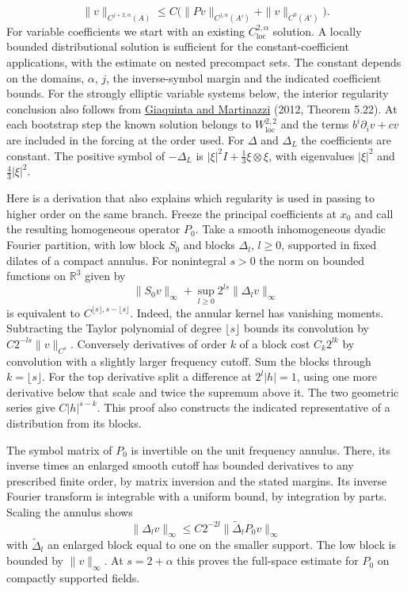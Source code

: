 \documentclass[
  english,
  11pt,
  reqno]{amsart}
\begin{document}
\label{eq:online-chart-interior-schauder-input} \[
\|v\|_{C^{j+2,\alpha}(A)}
\le C\bigl(\|Pv\|_{C^{j,\alpha}(A')}
+\|v\|_{C^0(A')}\bigr).
\] For variable coefficients we start with an existing
\(C^{2,\alpha}_{\mathrm{loc}}\) solution. A locally bounded
distributional solution is sufficient for the constant-coefficient
applications, with the estimate on nested precompact sets. The constant
depends on the domains, \(\alpha\), \(j\), the inverse-symbol margin and
the indicated coefficient bounds. For the strongly elliptic variable
systems below, the interior regularity conclusion also follows from
\hyperref[ref-GiaquintaMartinazzi2012]{Giaquinta and Martinazzi} (2012,
Theorem 5.22). At each bootstrap step the known solution belongs to
\(W^{2,2}_{\mathrm{loc}}\) and the terms \(b^i\partial_i v+cv\) are
included in the forcing at the order used. For \(\Delta\) and
\(\Delta_L\) the coefficients are constant. The positive symbol of
\(-\Delta_L\) is \(|\xi|^2I+\frac13\xi\otimes\xi\), with eigenvalues
\(|\xi|^2\) and \(\frac43|\xi|^2\).

Here is a derivation that also explains which regularity is used in
passing to higher order on the same branch. Freeze the principal
coefficients at \(x_0\) and call the resulting homogeneous operator
\(P_0\). Take a smooth inhomogeneous dyadic Fourier partition, with low
block \(S_0\) and blocks \(\Delta_l\), \(l\ge0\), supported in fixed
dilates of a compact annulus. For nonintegral \(s>0\) the norm on
bounded functions on \(\mathbb R^3\) given by \[
\|S_0v\|_\infty+\sup_{l\ge0}2^{ls}\|\Delta_lv\|_\infty
\] is equivalent to \(C^{\lfloor s\rfloor,s-\lfloor s\rfloor}\). Indeed,
the annular kernel has vanishing moments. Subtracting the Taylor
polynomial of degree \(\lfloor s\rfloor\) bounds its convolution by
\(C2^{-ls}\|v\|_{C^s}\). Conversely derivatives of order \(k\) of a
block cost \(C_k2^{lk}\) by convolution with a slightly larger frequency
cutoff. Sum the blocks through \(k=\lfloor s\rfloor\). For the top
derivative split a difference at \(2^l|h|=1\), using one more derivative
below that scale and twice the supremum above it. The two geometric
series give \(C|h|^{s-k}\). This proof also constructs the indicated
representative of a distribution from its blocks.

The symbol matrix of \(P_0\) is invertible on the unit frequency
annulus. There, its inverse times an enlarged smooth cutoff has bounded
derivatives to any prescribed finite order, by matrix inversion and the
stated margins. Its inverse Fourier transform is integrable with a
uniform bound, by integration by parts. Scaling the annulus shows \[
\|\Delta_lv\|_\infty\le C2^{-2l}\|\widetilde\Delta_l P_0v\|_\infty
\] with \(\widetilde\Delta_l\) an enlarged block equal to one on the
smaller support. The low block is bounded by \(\|v\|_\infty\). At
\(s=2+\alpha\) this proves the full-space estimate for \(P_0\) on
compactly supported fields.
\end{document}

